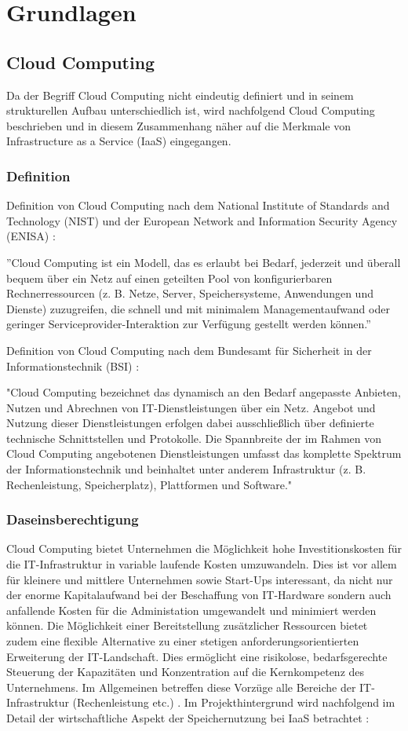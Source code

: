 \documentclass[12pt,a4paper,bibliography=totocnumbered,listof=totocnumbered]{scrartcl}
\begin{document}
\section{Grundlagen}\label{GrundlagenV}
\subsection{Cloud Computing}
Da der Begriff Cloud Computing nicht eindeutig definiert und in seinem strukturellen Aufbau unterschiedlich ist, wird nachfolgend Cloud Computing beschrieben und in diesem Zusammenhang näher auf die Merkmale von Infrastructure as a Service (IaaS) eingegangen.
\subsubsection{Definition}
Definition von Cloud Computing nach dem National Institute of Standards and Technology (NIST) und der European Network and Information Security Agency (ENISA) \cite{34}:

''Cloud Computing ist ein Modell, das es erlaubt bei Bedarf, jederzeit und überall bequem über ein Netz auf einen geteilten Pool von konfigurierbaren Rechnerressourcen (z. B. Netze, Server, Speichersysteme, Anwendungen und Dienste) zuzugreifen, die schnell und mit minimalem Managementaufwand oder geringer Serviceprovider-Interaktion zur Verfügung gestellt werden können.''

Definition von Cloud Computing nach dem Bundesamt für Sicherheit in der Informationstechnik (BSI) \cite{35}:

"Cloud Computing bezeichnet das dynamisch an den Bedarf angepasste Anbieten, Nutzen und Abrechnen von IT-Dienstleistungen über ein Netz. Angebot und Nutzung dieser Dienstleistungen erfolgen dabei ausschließlich über definierte technische Schnittstellen und Protokolle. Die Spannbreite der im Rahmen von Cloud Computing angebotenen Dienstleistungen umfasst das komplette Spektrum der Informationstechnik und beinhaltet unter anderem Infrastruktur (z. B. Rechenleistung, Speicherplatz), Plattformen und Software."

\subsubsection{Daseinsberechtigung}\label{CloudV}
Cloud Computing bietet Unternehmen die Möglichkeit hohe Investitionskosten für die IT-Infrastruktur in variable laufende Kosten umzuwandeln. Dies ist vor allem für kleinere und mittlere Unternehmen sowie Start-Ups interessant, da nicht nur der enorme Kapitalaufwand bei der Beschaffung von IT-Hardware sondern auch anfallende Kosten für die Administation umgewandelt und minimiert werden können. Die Möglichkeit einer Bereitstellung zusätzlicher Ressourcen bietet zudem eine flexible Alternative zu einer stetigen anforderungsorientierten Erweiterung der IT-Landschaft. Dies ermöglicht eine risikolose, bedarfsgerechte Steuerung der Kapazitäten und Konzentration auf die Kernkompetenz des Unternehmens. Im Allgemeinen betreffen diese Vorzüge alle Bereiche der IT-Infrastruktur (Rechenleistung etc.) \cite[S. 35]{39}. Im Projekthintergrund wird nachfolgend im Detail der wirtschaftliche Aspekt der Speichernutzung bei IaaS betrachtet \cite[S. 35 ff.]{39}:
\end{document}
